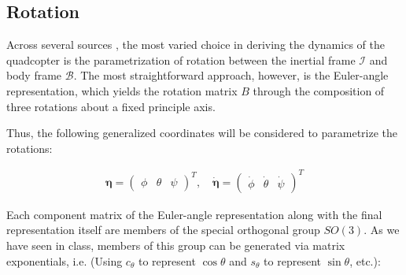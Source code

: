 \documentclass{article}
\begin{document}
\subsection{Rotation}

\newcommand{\lag}{\mathcal{L}}
\newcommand{\dd}[2]{\frac{d #1}{d #2}}
\newcommand{\pp}[2]{\frac{\partial #1}{\partial #2}}
\newcommand{\ddt}[1][]{\dd{#1}{t}}
\newcommand{\ppt}[1][]{\pp{#1}{t}}
\newcommand{\half}{\frac{1}{2}}
\newcommand{\W}{\Omega}
\DeclarePairedDelimiter\norm{\lVert}{\rVert}

\newcommand{\sq}{\boldsymbol{q}}
\newcommand{\sxi}{\boldsymbol{\xi}}
\newcommand{\seta}{\boldsymbol{\eta}}

Across several sources \cite{beard2008quadrotor, nakano2013quad, fresk2013full}, the most varied choice in deriving the dynamics of the quadcopter is the parametrization of rotation between the inertial frame $\mathcal{I}$ and body frame $\mathcal{B}$. The most straightforward approach, however, is the Euler-angle representation, which yields the rotation matrix $B$ through the composition of three rotations about a fixed principle axis.

Thus, the following generalized coordinates will be considered to parametrize the rotations:

\begin{gather}
    \seta = 
    \begin{pmatrix} \phi & \theta & \psi \end{pmatrix}^T
    , \quad 
    \dot{\seta} = 
    \begin{pmatrix}
        \dot{\phi} & \dot{\theta} & \dot{\psi}
    \end{pmatrix}^T
\end{gather}

Each component matrix of the Euler-angle representation along with the final representation itself are members of the special orthogonal group $SO(3)$. As we have seen in class, members of this group can be generated via matrix exponentials, i.e. (Using $c_\theta$ to represent $\cos{\theta}$ and $s_\theta$ to represent $\sin{\theta}$, etc.):

\renewcommand{\sin}[1]{\text{s}_{#1}}
\renewcommand{\cos}[1]{\text{c}_{#1}}

\end{document}
